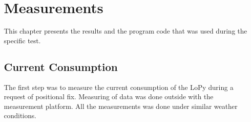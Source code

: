 \chapter{Measurements}

 This chapter presents the results and the program code that was used during the  specific test. 






\section{Current Consumption}

The first step was to measure the current consumption of the LoPy during a request of positional fix. Measuring of data was done outside with the measurement platform. All the measurements was done under similar weather conditions. 



